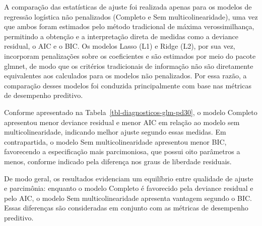 \documentclass[
  brazilian,
  12pt,
  letterpaper,
  DIV=11,
  numbers=noendperiod]{scrartcl}
\begin{document}
A comparação das estatísticas de ajuste foi realizada apenas para os
modelos de regressão logística não penalizados (Completo e Sem
multicolinearidade), uma vez que ambos foram estimados pelo método
tradicional de máxima verossimilhança, permitindo a obtenção e a
interpretação direta de medidas como a deviance residual, o AIC e o BIC.
Os modelos Lasso (L1) e Ridge (L2), por sua vez, incorporam penalizações
sobre os coeficientes e são estimados por meio do pacote glmnet, de modo
que os critérios tradicionais de informação não são diretamente
equivalentes aos calculados para os modelos não penalizados. Por essa
razão, a comparação desses modelos foi conduzida principalmente com base
nas métricas de desempenho preditivo.

Conforme apresentado na Tabela~\ref{tbl-diagnosticos-glm-pd30}, o modelo
Completo apresentou menor deviance residual e menor AIC em relação ao
modelo sem multicolinearidade, indicando melhor ajuste segundo essas
medidas. Em contrapartida, o modelo Sem multicolinearidade apresentou
menor BIC, favorecendo a especificação mais parcimoniosa, que possui
oito parâmetros a menos, conforme indicado pela diferença nos graus de
liberdade residuais.

De modo geral, os resultados evidenciam um equilíbrio entre qualidade de
ajuste e parcimônia: enquanto o modelo Completo é favorecido pela
deviance residual e pelo AIC, o modelo Sem multicolinearidade apresenta
vantagem segundo o BIC. Essas diferenças são consideradas em conjunto
com as métricas de desempenho preditivo.
\end{document}
